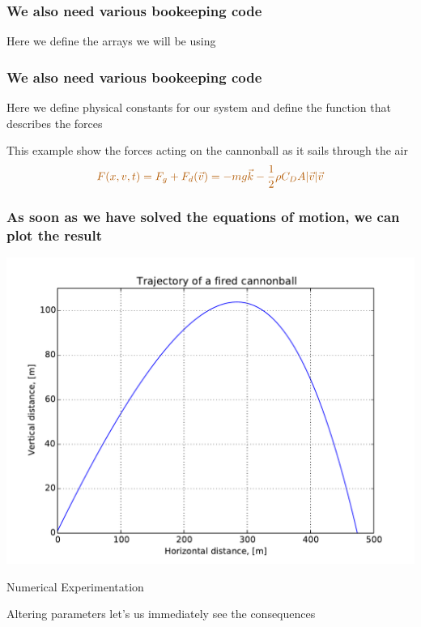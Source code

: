 \documentclass[english, 12pt]{beamer}
\newcommand{\alrt}{\color{AlertColor}}
\begin{document}
\begin{frame}[fragile]
\frametitle{We also need various bookeeping code}

Here we define the arrays we will be using

\end{frame}

\begin{frame}[fragile]
\frametitle{We also need various bookeeping code}

Here we define physical constants for our system and define the function that describes the forces


This example show the forces acting on the cannonball as it sails through the air
$$\alrt F(x,v,t) = F_g + F_d(\vec{v}) = -mg\vec{k} - \frac{1}{2}\rho C_D A |\vec{v}|\vec{v}$$
\end{frame}

\begin{frame}[fragile]
\frametitle{As soon as we have solved the equations of motion, we can plot the result}


\end{frame}

\begin{frame}[fragile]
\begin{center}
	\includegraphics[width=\textwidth]{fig/plot_cannonball1}
\end{center}
\end{frame}

\begin{frame}
\begin{center}
{\Huge \color{DarkFern} Numerical Experimentation}

Altering parameters let's us immediately see the consequences
\end{center}
\end{frame}
\end{document}
